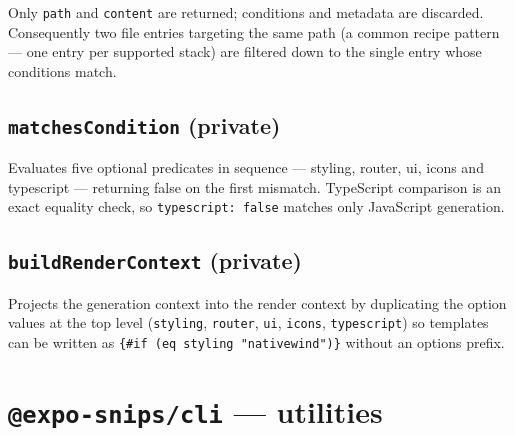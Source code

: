 Only \texttt{path} and \texttt{content} are returned; conditions and metadata are
discarded. Consequently two file entries targeting the same path (a common recipe
pattern --- one entry per supported stack) are filtered down to the single entry
whose conditions match.

\subsection*{\texttt{matchesCondition} (private)}

Evaluates five optional predicates in sequence --- styling, router, ui, icons and
typescript --- returning false on the first mismatch. TypeScript comparison is an
exact equality check, so \texttt{typescript: false} matches only JavaScript
generation.

\subsection*{\texttt{buildRenderContext} (private)}

Projects the generation context into the render context by duplicating the option
values at the top level (\texttt{styling}, \texttt{router}, \texttt{ui},
\texttt{icons}, \texttt{typescript}) so templates can be written as
\texttt{\{\#if (eq styling "nativewind")\}} without an options prefix.

\section{\texttt{@expo-snips/cli} --- utilities}

